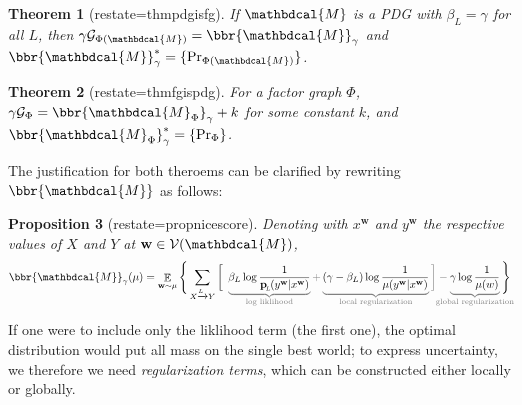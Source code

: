 \documentclass{article}
\theoremstyle{plain}
\newtheorem{theorem}{Theorem}[section]
\newtheorem{prop}[theorem]{Proposition}
\theoremstyle{definition}
\theoremstyle{remark}
\newcommand{\thickD}{I\mkern-8muD}
\newcommand{\kldiv}{\thickD\infdivx}
\DeclareMathOperator*{\E}{\mathbb{E}} %
\newcommand\mat[1]{\mathbf{#1}}
\newcommand{\bp}[1][L]{\mat{p}_{\!_{#1}\!}}
\newcommand{\V}{\mathcal V}
\newcommand{\dg}[1]{\mathbdcal{#1}}
\newcommand{\PDGof}[1]{{\dg M}_{#1}}
\numberwithin{equation}{section}
\begin{document}
\begin{theorem}[restate=thmpdgisfg]\label{thm:pdg-is-fg}
If $\dg M$ is a PDG with $\beta_L = \gamma$ for all 
 $L$, then
$\gamma \mathcal G_{\Phi(\dg M)} = \bbr{\dg M}_{\gamma}$ and
$\bbr{\dg M}_{\gamma}^* = \{\Pr_{\Phi({\dg M})} \}$.
\end{theorem}
\begin{theorem}[restate=thmfgispdg]\label{thm:fg-is-pdg}
For a factor graph $\Phi$,
	$\gamma \mathcal G_\Phi = \bbr{\PDGof{\Phi}}_{\gamma} + k$        
for some constant $k$, and 
        $\bbr{\PDGof{\Phi}}_{\gamma}^* = \{\Pr_{\Phi} \}$. 
\end{theorem}
The justification for both theroems can be clarified by rewriting $\bbr{\dg M}$ as follows:
\begin{prop}[restate=propnicescore] \label{prop:nice-score}
Denoting with $x^{\mat w}$ and $y^{\mat w}$ the respective values of $X$ and $Y$ at $\mat w \in \V(\dg M)$,
\begin{equation}\label{eq:semantics-breakdown}
\bbr{\dg M}_\gamma(\mu) = \E_{\mat w \sim \mu} \Bigg\{ \sum_{ X \xrightarrow{\!\!L} Y  }
\bigg[~
    \color{gray}\underbrace{\color{black}
\beta_L \log \frac{1}{\bp(y^{\mat w} |x^{\mat w})}
	}_{\color{gray}\smash{\text{log liklihood}}} + \underbrace{\color{black}
(\gamma - \beta_L ) \log \frac{1}{\mu(y^{\mat w} |x^{\mat w})} 
	}_{\color{gray}\smash{\mathclap{\text{local regularization}}}}\bigg] - \underbrace{\color{black}
\gamma \log \frac{1}{\mu(w)} 
	}_{\color{gray}\smash{\mathclap{\text{global regularization}}}}\color{black}\Bigg\} 
\end{equation}
\end{prop}
\vspace{-1em}
If one were to include only the liklihood term (the first one), the optimal distribution would put all mass on the single best world; to express uncertainty, we therefore we need \emph{regularization terms}, which can be constructed either locally or globally.
\end{document}

